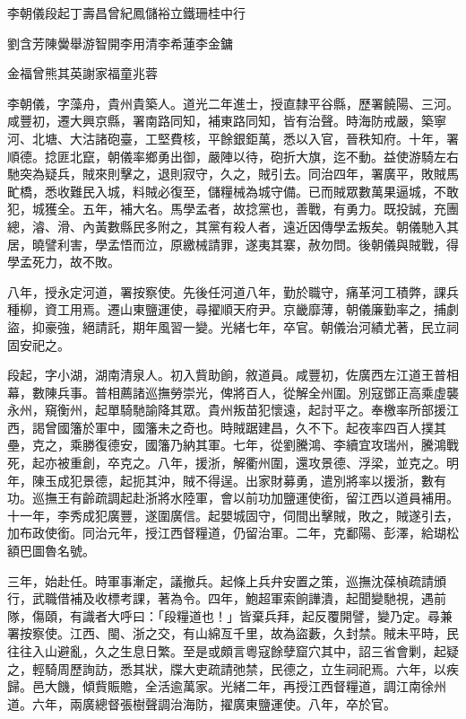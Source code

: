 
\begin{pinyinscope}
李朝儀段起丁壽昌曾紀鳳儲裕立鐵珊桂中行

劉含芳陳黌舉游智開李用清李希蓮李金鏞

金福曾熊其英謝家福童兆蓉

李朝儀，字藻舟，貴州貴築人。道光二年進士，授直隸平谷縣，歷署饒陽、三河。咸豐初，遷大興京縣，署南路同知，補東路同知，皆有治聲。時海防戒嚴，築寧河、北塘、大沽諸砲臺，工堅費核，平餘銀鉅萬，悉以入官，晉秩知府。十年，署順德。捻匪北竄，朝儀率鄉勇出御，嚴陣以待，砲折大旗，迄不動。益使游騎左右馳突為疑兵，賊來則擊之，退則寂守，久之，賊引去。同治四年，署廣平，敗賊馬甿橋，悉收難民入城，料賊必復至，儲糧械為城守備。已而賊眾數萬果逼城，不敢犯，城獲全。五年，補大名。馬學孟者，故捻黨也，善戰，有勇力。既投誠，充團總，濬、滑、內黃數縣民多附之，其黨有殺人者，遠近因傳學孟叛矣。朝儀馳入其居，曉譬利害，學孟悟而泣，原繳械請罪，遂夷其寨，赦勿問。後朝儀與賊戰，得學孟死力，故不敗。

八年，授永定河道，署按察使。先後任河道八年，勤於職守，痛革河工積弊，課兵種柳，資工用焉。遷山東鹽運使，尋擢順天府尹。京畿靡薄，朝儀廉勤率之，捕劇盜，抑豪強，絕請託，期年風習一變。光緒七年，卒官。朝儀治河績尤著，民立祠固安祀之。

段起，字小湖，湖南清泉人。初入貲助餉，敘道員。咸豐初，佐廣西左江道王普相幕，數陳兵事。普相薦諸巡撫勞崇光，俾將百人，從解全州圍。別寇鄧正高乘虛襲永州，窺衡州，起單騎馳諭降其眾。貴州叛苗犯懷遠，起討平之。奉檄率所部援江西，謁曾國籓於軍中，國籓未之奇也。時賊踞建昌，久不下。起夜率四百人撲其壘，克之，乘勝復德安，國籓乃納其軍。七年，從劉騰鴻、李續宜攻瑞州，騰鴻戰死，起亦被重創，卒克之。八年，援浙，解衢州圍，還攻景德、浮梁，並克之。明年，陳玉成犯景德，起扼其沖，賊不得逞。出家財募勇，遣別將率以援浙，數有功。巡撫王有齡疏調起赴浙將水陸軍，會以前功加鹽運使銜，留江西以道員補用。十一年，李秀成犯廣豐，遂圍廣信。起嬰城固守，伺間出擊賊，敗之，賊遂引去，加布政使銜。同治元年，授江西督糧道，仍留治軍。二年，克鄱陽、彭澤，給瑚松額巴圖魯名號。

三年，始赴任。時軍事漸定，議撤兵。起條上兵弁安置之策，巡撫沈葆楨疏請頒行，武職借補及收標考課，著為令。四年，鮑超軍索餉譁潰，起聞變馳視，遇前隊，傷頤，有識者大呼曰：「段糧道也！」皆棄兵拜，起反覆開譬，變乃定。尋兼署按察使。江西、閩、浙之交，有山綿亙千里，故為盜藪，久封禁。賊未平時，民往往入山避亂，久之生息日繁。至是或頗言粵寇餘孽窟穴其中，詔三省會剿，起疑之，輕騎周歷詢訪，悉其狀，牒大吏疏請弛禁，民德之，立生祠祀焉。六年，以疾歸。邑大饑，傾貲賑贍，全活逾萬家。光緒二年，再授江西督糧道，調江南徐州道。六年，兩廣總督張樹聲調治海防，擢廣東鹽運使。八年，卒於官。


\end{pinyinscope}
